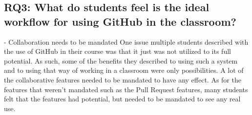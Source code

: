 

\subsection{RQ3: What do students feel is the ideal workflow for using GitHub in the classroom?}

- Collaboration needs to be mandated
One issue multiple students described with the use of GitHub in their course was that it just was not utilized to its full potential. As such, some of the benefits they described to using such a system and to using that way of working in a classroom were only possibilities. A lot of the collaborative features needed to be mandated to have any effect. As for the features that weren't mandated such as the Pull Request features, many students felt that the features had potential, but needed to be mandated to see any real use.









